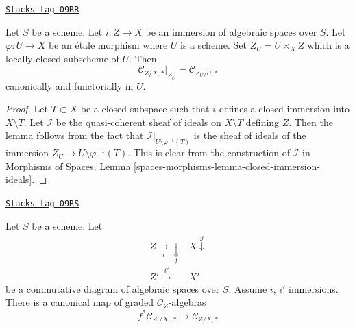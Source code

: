 \begin{lemma}
\label{spaces-more-morphisms-lemma-etale-conormal-algebra}
\href{https://stacks.math.columbia.edu/tag/09RR}{\texttt{Stacks tag 09RR}}

Let $S$ be a scheme. Let $i : Z \to X$ be an immersion of algebraic spaces
over $S$. Let $\varphi : U \to X$ be an \'etale morphism where $U$ is a
scheme. Set $Z_U = U \times_X Z$ which is a locally closed subscheme of $U$.
Then
$$
\mathcal{C}_{Z/X, *}|_{Z_U} = \mathcal{C}_{Z_U/U, *}
$$
canonically and functorially in $U$.
\end{lemma}

\begin{proof}
Let $T \subset X$ be a closed subspace such that $i$ defines a closed
immersion into $X \setminus T$. Let $\mathcal{I}$ be the quasi-coherent
sheaf of ideals on $X \setminus T$ defining $Z$. Then the lemma follows
from the fact that
$\mathcal{I}|_{U \setminus \varphi^{-1}(T)}$ is the sheaf of ideals of
the immersion $Z_U \to U \setminus \varphi^{-1}(T)$.
This is clear from the construction of $\mathcal{I}$ in
Morphisms of Spaces, Lemma
\ref{spaces-morphisms-lemma-closed-immersion-ideals}.
\end{proof}

\begin{lemma}
\label{spaces-more-morphisms-lemma-conormal-algebra-functorial}
\href{https://stacks.math.columbia.edu/tag/09RS}{\texttt{Stacks tag 09RS}}

Let $S$ be a scheme. Let
$$
\begin{array}{cc}Z \underset{i}{\longrightarrow}\underset{f}{\downarrow} & X \overset{g}{\downarrow} \\ Z' \overset{i'}{\longrightarrow} & X'\end{array}
$$
be a commutative diagram of algebraic spaces over $S$.
Assume $i$, $i'$ immersions. There is a canonical map
of graded $\mathcal{O}_Z$-algebras
$$
f^*\mathcal{C}_{Z'/X', *}
\longrightarrow
\mathcal{C}_{Z/X, *}
$$
\end{lemma}

